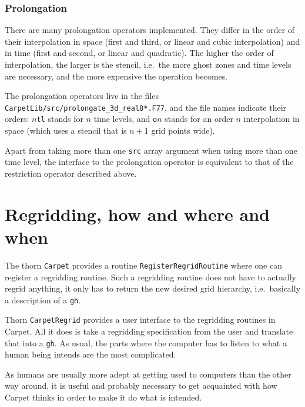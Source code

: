 \documentclass{article}
\begin{document}
\subsubsection{Prolongation}

   There are many prolongation operators implemented.  They differ in
   the order of their interpolation in space (first and third, or
   linear and cubic interpolation) and in time (first and second, or
   linear and quadratic).  The higher the order of interpolation, the
   larger is the stencil, i.e.\ the more ghost zones and time levels
   are necessary, and the more expensive the operation becomes.

   The prolongation operators live in the files
   \texttt{CarpetLib/src/prolongate\_3d\_real8*.F77}, and the file
   names indicate their orders: \texttt{$n$tl} stands for $n$ time
   levels, and \texttt{o$n$} stands for an order $n$ interpolation in
   space (which uses a stencil that is $n+1$ grid points wide).

   Apart from taking more than one \texttt{src} array argument when
   using more than one time level, the interface to the prolongation
   operator is equivalent to that of the restriction operator
   described above.



\section{Regridding, how and where and when}

   The thorn \texttt{Carpet} provides a routine
   \texttt{RegisterRegridRoutine} where one can register a regridding
   routine.  Such a regridding routine does not have to actually
   regrid anything, it only has to return the new desired grid
   hierarchy, i.e.\ basically a description of a \texttt{gh}.

   Thorn \texttt{CarpetRegrid} provides a user interface to the
   regridding routines in Carpet.  All it does is take a regridding
   specification from the user and translate that into a \texttt{gh}.
   As usual, the parts where the computer has to listen to what a
   human being intends are the most complicated.

   As humans are usually more adept at getting used to computers than
   the other way around, it is useful and probably necessary to get
   acquainted with how Carpet thinks in order to make it do what is
   intended.
\end{document}
